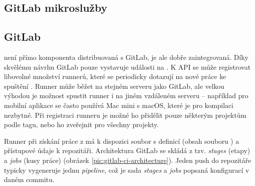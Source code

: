     \subsection{GitLab mikroslužby}
        \blind[1]
        \blind[1]
        \blind[1]

    \subsection{GitLab \CI}
        \CI není přímo komponenta distribuovaná s GitLab, je ale dobře zaintegrovaná. Díky skvělému návrhu GitLab pouze vystavuje události na . K API se může registrovat libovolné množství runnerů, které se periodicky  dotazují na nové práce ke spuštění \cite{gitlab-runner-registration}. Runner může běžet na stejném serveru jako GitLab, ale velkou výhodou je možnost spustit runner i na jiném vzdáleném serveru -- například pro mobilní aplikace se často používá Mac mini s macOS, které je pro kompilaci nezbytné. Při registraci runneru je možné ho přidělit pouze některým projektům podle tagu, nebo ho zveřejnit pro všechny projekty. 

        Runner při získání práce z  má k dispozici soubor s definicí (obsah souboru  \cite{gitlab-runner-yaml}) a přístupové údaje k repozitáři. Architektura GitLab \CI se skládá z tzv. \textit{stages} (etapy) a \textit{jobs} (kusy práce) (obrázek \ref{pic:gitlab-ci-architecture}). Jeden push do repozitáře typicky vygeneruje jednu \textit{pipeline}, což je sada \textit{stages} a \textit{jobs} popsaná konfigurací \CI v daném commitu.


        \blind[1]

